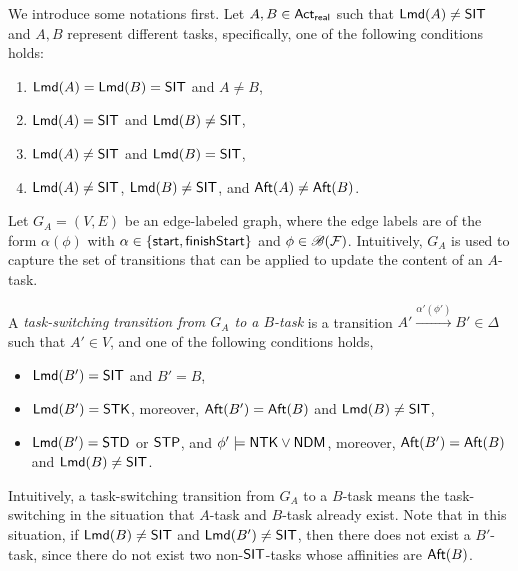 


We introduce some notations first. Let $A, B \in {\sf Act}_{\sf real}$ such that ${\sf Lmd}(A) \neq {\sf SIT}$ and $A, B$ represent different tasks, specifically, one of the following conditions holds:
\begin{enumerate}
\item ${\sf Lmd}(A) = {\sf Lmd}(B) = {\sf SIT}$ and $A \neq B$, 
\item ${\sf Lmd}(A) = {\sf SIT}$ and ${\sf Lmd}(B) \neq {\sf SIT}$, 
\item ${\sf Lmd}(A) \neq {\sf SIT}$ and ${\sf Lmd}(B) = {\sf SIT}$, 
\item ${\sf Lmd}(A) \neq {\sf SIT}$, ${\sf Lmd}(B) \neq {\sf SIT}$, and ${\sf Aft}(A) \neq {\sf Aft}(B)$.
\end{enumerate}


Let $G_A=(V, E)$ be an edge-labeled graph,  where the edge labels are of the form $\alpha(\phi)$ with $\alpha \in \{{\mathsf{start} }, {\mathsf{finishStart} }\}$ and $\phi \in \mathscr{B}({\mathcal{F} })$. Intuitively,  
%
$G_A$ is used to capture the set of transitions that can be applied to update the content of an $A$-task. 
%

%
A \emph{task-switching transition from $G_A$ to a $B$-task} is a transition $A' \xrightarrow{\alpha'(\phi')} B' \in \Delta$ such that 
$A' \in V$, and one of the following conditions holds,
\begin{itemize}
%
\item ${\sf Lmd}(B') = {\sf SIT}$ and $B'=B$, 
%
\item ${\sf Lmd}(B') = {\sf STK}$, moreover, ${\sf Aft}(B') = {\sf Aft}(B)$ and ${\sf Lmd}(B) \neq {\sf SIT}$, 
%
\item  ${\sf Lmd}(B') = {\sf STD}$ or ${\sf STP}$, and $\phi' \models {\sf NTK}\vee{\sf NDM}$,  moreover, ${\sf Aft}(B') = {\sf Aft}(B)$ and ${\sf Lmd}(B) \neq {\sf SIT}$.
\end{itemize}
Intuitively, a task-switching transition from $G_A$ to a $B$-task means the task-switching in the situation that $A$-task and $B$-task already exist. Note that in this situation, if ${\sf Lmd}(B) \neq {\sf SIT}$ and ${\sf Lmd}(B') \neq {\sf SIT}$, then there does not exist a $B'$-task, since there do not exist two non-${\sf SIT}$-tasks whose affinities are ${\sf Aft}(B)$.

